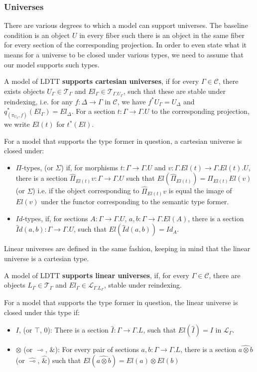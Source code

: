 \subsubsection{Universes}
There are various degrees to which a model can support universes. The baseline condition is an object $U$ in every fiber such there is an object in the same fiber for every section of the corresponding projection. In order to even state what it means for a universe to be closed under various types, we need to assume that our model supports such types.
\begin{defn}A model of LDTT \textbf{supports cartesian universes}, if for every $\Gamma \in \mathcal{C}$, there exists objects $U_\Gamma \in \mathcal{T}_{\Gamma}$ and $El_\Gamma \in \mathcal{T}_{\Gamma.U_\Gamma}$, such that these are stable under reindexing, i.e. for any $f : \Delta \to \Gamma$ in $\mathcal{C}$, we have $f^*U_\Gamma = U_\Delta$ and $q_{(\pi_{U_\Gamma}, f)}^*(El_\Gamma) = El_\Delta$. For a section $t : \Gamma \to \Gamma.U$ to the corresponding projection, we write $El(t)$ for $t^*(El)$.

  For a model that supports the type former in question, a cartesian universe is closed under:
  \begin{itemize}
  \item $\Pi$-types, (or $\Sigma$) if, for morphisms $t : \Gamma \to \Gamma.U$ and $v : \Gamma.El(t) \to \Gamma.El(t).U$, there is a section $\hat \Pi_{El(t)}v : \Gamma \to \Gamma.U$ such that $El(\hat \Pi_{El(t)}) = \Pi_{El(t)}El(v)$ (or $\Sigma$) i.e. if the object corresponding to $\hat \Pi_{El(t)}v$ is equal the image of $El(v)$ under the functor corresponding to the semantic type former.
  \item $Id$-types, if, for sections $A : \Gamma \to \Gamma.U$, $a, b : \Gamma \to \Gamma.El(A)$, there is a section $\hat Id(a, b) : \Gamma \to \Gamma.U$, such that $El(\hat Id(a, b)) = Id_A$.
  \end{itemize}
\end{defn}
Linear universes are defined in the same fashion, keeping in mind that the linear universe is a cartesian type.
\begin{defn}
  A model of LDTT \textbf{supports linear universes}, if, for every $\Gamma \in \mathcal{C}$, there are objects $L_\Gamma \in \mathcal{T}_{\Gamma}$ and $El_\Gamma \in \mathcal{L}_{\Gamma.L_\Gamma}$, stable under reindexing.

  For a model that supports the type former in question, the linear universe is closed under this type if:
  \begin{itemize}
    \item $I$, (or $\top$, $0$): There is a section $\hat I : \Gamma \to \Gamma.L$, such that $El(\hat I) = I$ in $\mathcal{L}_\Gamma$.
    \item $\otimes$ (or $\multimap$, $\&$): For every pair of sections $a, b : \Gamma \to \Gamma.L$, there is a section $\hat{a\otimes b}$ (or $\hat \multimap$, $\hat \&$) such that $El(\hat{a\otimes b}) = El(a)\otimes El(b)$
    \end{itemize}
  \end{defn}
